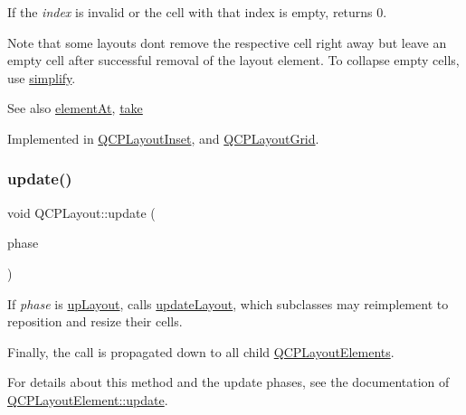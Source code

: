 If the {\itshape index} is invalid or the cell with that index is empty, returns 0.

Note that some layouts don\textquotesingle{}t remove the respective cell right away but leave an empty cell after successful removal of the layout element. To collapse empty cells, use \hyperlink{class_q_c_p_layout_a41e6ac049143866e8f8b4964efab01b2}{simplify}.

\begin{DoxySeeAlso}{See also}
\hyperlink{class_q_c_p_layout_afa73ca7d859f8a3ee5c73c9b353d2a56}{element\+At}, \hyperlink{class_q_c_p_layout_ada26cd17e56472b0b4d7fbbc96873e4c}{take} 
\end{DoxySeeAlso}


Implemented in \hyperlink{class_q_c_p_layout_inset_abf2e8233f5b7051220907e62ded490a2}{Q\+C\+P\+Layout\+Inset}, and \hyperlink{class_q_c_p_layout_grid_a17dd220234d1bbf8835abcc666384d45}{Q\+C\+P\+Layout\+Grid}.

\mbox{\label{class_q_c_p_layout_a48ecc9c98ea90b547c3e27a931a8f7bd}} 
\subsubsection{\texorpdfstring{update()}{update()}}
{\footnotesize\ttfamily void Q\+C\+P\+Layout\+::update (\begin{DoxyParamCaption}\item[{\hyperlink{class_q_c_p_layout_element_a0d83360e05735735aaf6d7983c56374d}{Update\+Phase}}]{phase }\end{DoxyParamCaption})\hspace{0.3cm}{\ttfamily [virtual]}}

If {\itshape phase} is \hyperlink{class_q_c_p_layout_element_a0d83360e05735735aaf6d7983c56374da5d1ccf5d79967c232c3c511796860045}{up\+Layout}, calls \hyperlink{class_q_c_p_layout_a165c77f6287ac92e8d03017ad913378b}{update\+Layout}, which subclasses may reimplement to reposition and resize their cells.

Finally, the call is propagated down to all child \hyperlink{class_q_c_p_layout_element}{Q\+C\+P\+Layout\+Elements}.

For details about this method and the update phases, see the documentation of \hyperlink{class_q_c_p_layout_element_a929c2ec62e0e0e1d8418eaa802e2af9b}{Q\+C\+P\+Layout\+Element\+::update}. 

